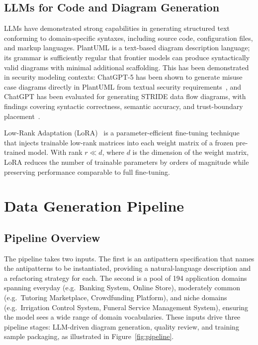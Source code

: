 \documentclass[12pt, a4paper]{article}
\begin{document}
\subsection{LLMs for Code and Diagram Generation}

LLMs have demonstrated strong capabilities in generating
structured text conforming to domain-specific syntaxes, including source
code, configuration files, and markup languages.  PlantUML is a text-based
diagram description language; its grammar is sufficiently regular that
frontier models can produce syntactically valid diagrams with minimal
additional scaffolding.
This has been demonstrated in security modeling contexts: ChatGPT-5 has
been shown to generate misuse case diagrams directly in PlantUML from
textual security requirements~\cite{enase26}, and ChatGPT has been
evaluated for generating STRIDE data flow diagrams, with findings covering
syntactic correctness, semantic accuracy, and trust-boundary
placement~\cite{alsayegh2026stride}.


Low-Rank Adaptation (LoRA)~\cite{hu2022lora} is a parameter-efficient
fine-tuning technique that injects trainable low-rank matrices into each
weight matrix of a frozen pre-trained model.  With rank $r \ll d$, where $d$
is the dimension of the weight matrix, LoRA reduces the number of trainable parameters
by orders of magnitude while preserving performance comparable to full
fine-tuning.

\section{Data Generation Pipeline}
\label{sec:pipeline}

\subsection{Pipeline Overview}

The pipeline takes two inputs.  The first is an antipattern specification
that names the antipatterns to be instantiated, providing a natural-language
description and a refactoring strategy for each.  The second is a pool of
194 application domains spanning everyday (e.g.\ Banking System, Online
Store), moderately common (e.g.\ Tutoring Marketplace, Crowdfunding
Platform), and niche domains (e.g.\ Irrigation Control System, Funeral
Service Management System), ensuring the model sees a wide
range of domain vocabularies.  These inputs drive three pipeline stages:
LLM-driven diagram generation, quality review, and
training sample packaging, as illustrated in Figure~\ref{fig:pipeline}.
\end{document}
